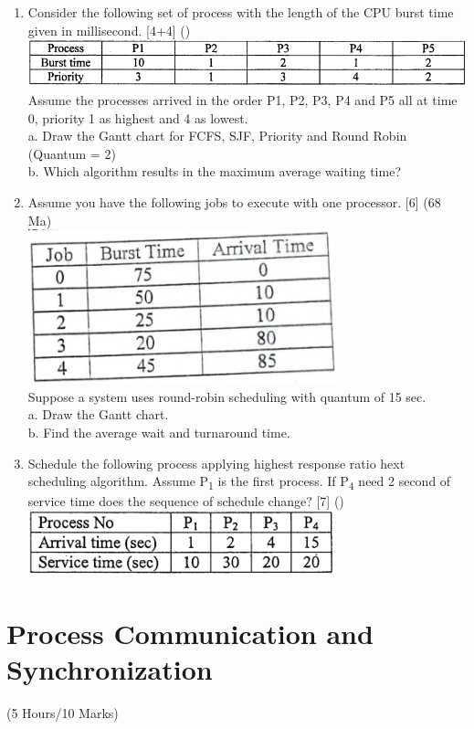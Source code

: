 \documentclass[12pt]{article}
\newcommand{\sub}[1]{\textsubscript{#1}}
\begin{document}
\begin{enumerate}
			\item Consider the following set of process with the length of the CPU burst time given in millisecond. \hfill [4+4] ()
			\includegraphics[width=6in]{./pics/os_21}\\
			Assume the processes arrived in the order P1, P2, P3, P4 and P5 all at time 0, priority 1 as highest and 4 as lowest.\\
			a. Draw the Gantt chart for FCFS, SJF, Priority and Round Robin (Quantum = 2)\\
			b. Which algorithm results in the maximum average waiting time?
			
			\item Assume you have the following jobs to execute with one processor. \hfill [6] (68 Ma)\\
			\includegraphics[width=3.5in]{./pics/os_22}\\
			Suppose a system uses round-robin scheduling with quantum of 15 sec.\\
			a. Draw the Gantt chart.\\
			b. Find the average wait and turnaround time.

			\item Schedule the following process applying highest response ratio hext scheduling algorithm. Assume P\sub{1} is the first process. If P\sub{4} need 2 second of service time does the sequence of schedule change? \hfill [7] ()\\
			\includegraphics[width=3.5in]{./pics/os_24}
		\end{enumerate}

	\pagebreak
\section{Process Communication and Synchronization}
	\begin{center}(5 Hours/10 Marks)\end{center}
\end{document}
